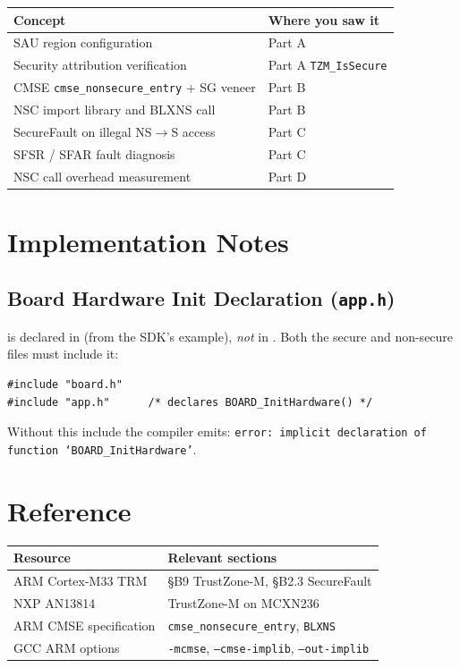 \documentclass[11pt, a4paper]{article}
\begin{document}
\renewcommand{\arraystretch}{1.3}
\begin{tabular}{@{} p{7cm} p{6cm} @{}}
  \toprule
  \textbf{Concept} & \textbf{Where you saw it} \\
  \midrule
  SAU region configuration & Part A \\
  Security attribution verification & Part A \texttt{TZM\_IsSecure} \\
  CMSE \texttt{cmse\_nonsecure\_entry} + SG veneer & Part B \\
  NSC import library and BLXNS call & Part B \\
  SecureFault on illegal NS$\to$S access & Part C \\
  SFSR / SFAR fault diagnosis & Part C \\
  NSC call overhead measurement & Part D \\
  \bottomrule
\end{tabular}
\renewcommand{\arraystretch}{1}

\section{Implementation Notes}

\subsection{Board Hardware Init Declaration (\texttt{app.h})}

 is declared in  (from the SDK's
 example), \emph{not} in .
Both the secure and non-secure  files must include it:

\begin{lstlisting}[style=cstyle]
#include "board.h"
#include "app.h"      /* declares BOARD_InitHardware() */
\end{lstlisting}

Without this include the compiler emits:
\texttt{error: implicit declaration of function `BOARD\_InitHardware'}.

\section{Reference}

\renewcommand{\arraystretch}{1.3}
\begin{tabular}{@{} p{5.5cm} p{7.5cm} @{}}
  \toprule
  \textbf{Resource} & \textbf{Relevant sections} \\
  \midrule
  ARM Cortex-M33 TRM & \S B9 TrustZone-M, \S B2.3 SecureFault \\
  NXP AN13814 & TrustZone-M on MCXN236 \\
  ARM CMSE specification & \texttt{cmse\_nonsecure\_entry}, \texttt{BLXNS} \\
  GCC ARM options & \texttt{-mcmse}, \texttt{--cmse-implib}, \texttt{--out-implib} \\
  \bottomrule
\end{tabular}
\renewcommand{\arraystretch}{1}
\end{document}
